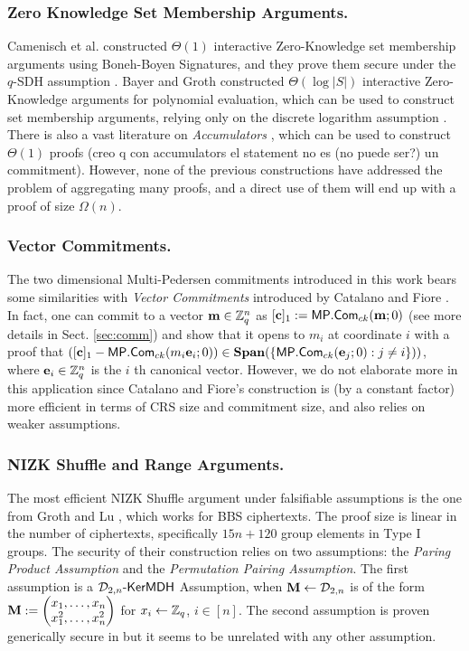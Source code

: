 \subsubsection{Zero Knowledge Set Membership Arguments.}
Camenisch et al. constructed $\Theta(1)$ interactive Zero-Knowledge set membership arguments using Boneh-Boyen Signatures, and they prove them secure under the $q$-SDH assumption \cite{AC:CamChaShe08}. Bayer and Groth constructed $\Theta(\log |S|)$ interactive Zero-Knowledge arguments for polynomial evaluation, which can be used to construct set membership arguments, relying only on the discrete logarithm assumption \cite{EC:BayGro13}. There is also a vast literature on \emph{Accumulators} \cite{EC:BenDeM93,C:CamLys02,AC:TsuXu03,RSA:LNguyen05,PKC:CamKohSor09,ICICS:WanWanPie07}, which can be used to construct $\Theta(1)$ proofs {\color{red}(creo q con accumulators el statement no es (no puede ser?) un commitment)}. However, none of the previous constructions have addressed the problem of aggregating many proofs, and a direct use of them will end up with a proof of size $\Omega(n)$.

\subsubsection{Vector Commitments.}
The two dimensional Multi-Pedersen commitments introduced in this work bears some similarities with \emph{Vector Commitments} introduced by Catalano and Fiore \cite{PKC:CatFio13}. In fact, one can commit to a vector $\mathbf{m}\in\mathbb{Z}_q^n$ as $[\mathbf{c}]_1:=\mathsf{MP}.\mathsf{Com}_{ck}(\mathbf{m};0)$ (see more details in Sect. \ref{sec:comm}) and show that it opens to $m_i$ at coordinate $i$ with a proof that $([\mathbf{c}]_1-\mathsf{MP}.\mathsf{Com}_{ck}(m_i\mathbf{e}_i;0))\in\mathbf{Span}(\{\mathsf{MP}.\mathsf{Com}_{ck}(\mathbf{e}_j;0):j\neq i\}))$, where $\mathbf{e}_i\in\mathbb{Z}_q^n$ is the $i$ th canonical vector. However, we do not elaborate more in this application since Catalano and Fiore's construction is (by a constant factor) more efficient in terms of CRS size and commitment size, and also relies on weaker assumptions.


\subsubsection{NIZK Shuffle and Range Arguments.}
The most efficient NIZK Shuffle argument under falsifiable assumptions is the one from Groth and Lu \cite{AC:GroLu07}, which works for BBS ciphertexts. The proof size is linear in the number of ciphertexts, specifically $15n + 120$ group elements in Type I groups. The security of their construction relies on two assumptions: the \emph{Paring Product Assumption} and the \emph{Permutation Pairing Assumption}. The first assumption is a $\mathcal{D}_{2,n}\mbox{-}\mathsf{KerMDH}$ Assumption, when $\mathbf{{M}}\gets\mathcal{D}_{2,n}$ is of the form $\mathbf{{M}}:=\left(\begin{matrix}x_1,\ldots,x_n\\x_1^2,\ldots,x_n^2\end{matrix}\right)$ for $x_i\gets\mathbb{Z}_q$, $i\in[n]$. The second assumption is proven generically secure in \cite{AC:GroLu07} but it seems to be unrelated with any other assumption.

